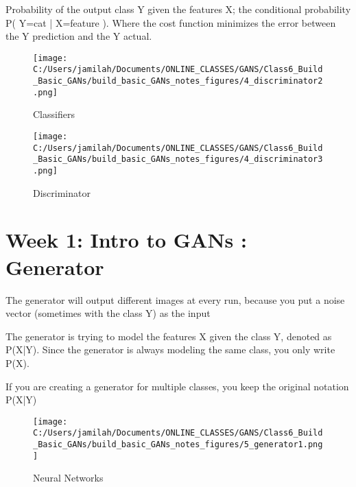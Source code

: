 \documentclass[11pt, onecolumn]{article}
\begin{document}
Probability of the output class Y given the features X; the conditional probability P( Y=cat | X=feature ).  Where the cost function minimizes the error between the Y prediction and the Y actual.

\begin{figure}[htp]
\begin{center}
\texttt{[image: C:/Users/jamilah/Documents/ONLINE\_CLASSES/GANS/Class6\_Build\_Basic\_GANs/build\_basic\_GANs\_notes\_figures/4\_discriminator2.png]}
\end{center}
\caption{Classifiers}
\label{4_discriminator2}
\end{figure}

\begin{figure}[htp]
\begin{center}
\texttt{[image: C:/Users/jamilah/Documents/ONLINE\_CLASSES/GANS/Class6\_Build\_Basic\_GANs/build\_basic\_GANs\_notes\_figures/4\_discriminator3.png]}
\end{center}
\caption{Discriminator}
\label{4_discriminator3}
\end{figure}


\clearpage
\section{Week 1: Intro to GANs : Generator}

The generator will output different images at every run, because you put a noise vector (sometimes with the class Y) as the input

The generator is trying to model the features X given the class Y, denoted as P(X|Y).  Since the generator is always modeling the same class, you only write P(X).

If you are creating a generator for multiple classes, you keep the original notation P(X|Y)

\begin{figure}[htp]
\begin{center}
\texttt{[image: C:/Users/jamilah/Documents/ONLINE\_CLASSES/GANS/Class6\_Build\_Basic\_GANs/build\_basic\_GANs\_notes\_figures/5\_generator1.png]}
\end{center}
\caption{Neural Networks}
\label{5_generator1}
\end{figure}
\end{document}
